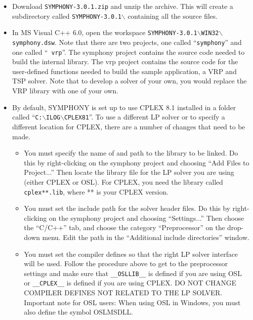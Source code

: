 \begin{itemize}

\item Download {\tt SYMPHONY-3.0.1.zip} and unzip the archive. This will
create a subdirectory called {\tt SYMPHONY-3.0.1$\backslash$} containing all 
the source files.

\item In MS Visual C++ 6.0, open the workspace 
{\tt SYMPHONY-3.0.1$\backslash$WIN32$\backslash$symphony.dsw}.  Note that
there are two projects, one called ``{\tt symphony}'' and one called ``{\tt
vrp}''.  The symphony project contains the source code needed to build the
internal library. The vrp project contains the source code for the
user-defined functions needed to build the sample application, a VRP and TSP
solver. Note that to develop a solver of your own, you would replace the VRP
library with one of your own.

\item By default, SYMPHONY is set up to use CPLEX 8.1 installed in a folder
called ``{\tt C:$\backslash$ILOG$\backslash$CPLEX81}''. To use a different LP 
solver or to specify a different location for CPLEX, there are a number of 
changes that need to be made.

\begin{itemize}

\item You must specify the name of and path to the library to be linked. Do 
this by right-clicking on the symphony project and choosing ``Add Files to
Project...'' Then locate the library file for the LP solver you are using
(either CPLEX or OSL). For CPLEX, you need the library called {\tt
cplex**.lib}, where ** is your CPLEX version.

\item You must set the include path for the solver header files. Do this
by right-clicking on the symphony project and choosing ``Settings...'' Then
choose the ``C/C++'' tab, and choose the category ``Preprocessor'' on the
drop-down menu.  Edit the path in the ``Additional include directories'' 
window.

\item You must set the compiler defines so that the right LP solver interface
will be used. Follow the procedure above to get to the preprocessor settings
and make sure that {\tt \_\_OSLLIB\_\_} is defined if you are using OSL or
{\tt \_\_CPLEX\_\_} is defined if you are using CPLEX. DO NOT CHANGE COMPILER
DEFINES NOT RELATED TO THE LP SOLVER. Important note for OSL users: When using
OSL in Windows, you must also define the symbol OSLMSDLL.


\end{itemize}
\end{itemize}
